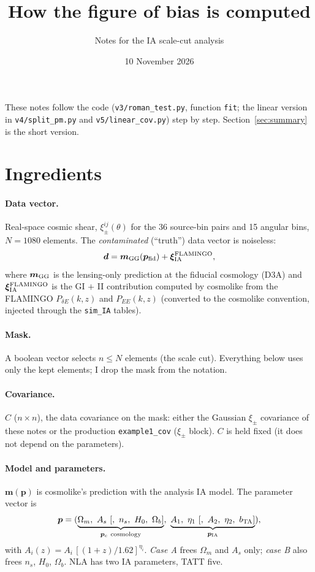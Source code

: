 \documentclass[11pt]{article}
\title{How the figure of bias is computed}
\author{Notes for the IA scale-cut analysis}
\date{10 November 2026}
\newcommand{\vd}{\bm{d}}
\newcommand{\vm}{\bm{m}}
\newcommand{\vp}{\bm{p}}
\begin{document}
\maketitle

\noindent These notes follow the code (\texttt{v3/roman\_test.py},
function \texttt{fit}; the linear version in \texttt{v4/split\_pm.py} and
\texttt{v5/linear\_cov.py}) step by step. Section~\ref{sec:summary} is the
short version.

\section{Ingredients}

\paragraph{Data vector.} Real-space cosmic shear, $\xi_\pm^{ij}(\theta)$ for
the 36 source-bin pairs and 15 angular bins, $N = 1080$ elements. The
\emph{contaminated} (``truth'') data vector is noiseless:
\begin{equation}
\vd = \vm_{\rm GG}(\vp_{\rm fid}) + \bm{\xi}_{\rm IA}^{\rm FLAMINGO},
\end{equation}
where $\vm_{\rm GG}$ is the lensing-only prediction at the fiducial cosmology
(D3A) and $\bm{\xi}_{\rm IA}^{\rm FLAMINGO}$ is the GI $+$ II contribution
computed by cosmolike from the FLAMINGO $P_{\delta E}(k,z)$ and $P_{EE}(k,z)$
(converted to the cosmolike convention, injected through the
\texttt{sim\_IA} tables).

\paragraph{Mask.} A boolean vector selects $n \le N$ elements (the scale
cut). Everything below uses only the kept elements; I drop the mask from the
notation.

\paragraph{Covariance.} $C$ ($n\times n$), the data covariance on the mask:
either the Gaussian $\xi_\pm$ covariance of these notes or the production
\texttt{example1\_cov} ($\xi_\pm$ block). $C$ is held fixed (it does not
depend on the parameters).

\paragraph{Model and parameters.} $\vm(\vp)$ is cosmolike's prediction with
the analysis IA model. The parameter vector is
\begin{equation}
\vp = (\underbrace{\Omega_m,\ A_s\ [,\ n_s,\ H_0,\ \Omega_b]}_{\vp_c\ \text{cosmology}},\ \underbrace{A_1,\ \eta_1\ [,\ A_2,\ \eta_2,\ b_{\rm TA}]}_{\vp_{\rm IA}}),
\end{equation}
with $A_i(z) = A_i\,[(1+z)/1.62]^{\eta_i}$. \emph{Case A} frees $\Omega_m$
and $A_s$ only; \emph{case B} also frees $n_s$, $H_0$, $\Omega_b$. NLA has
two IA parameters, TATT five.
\end{document}
